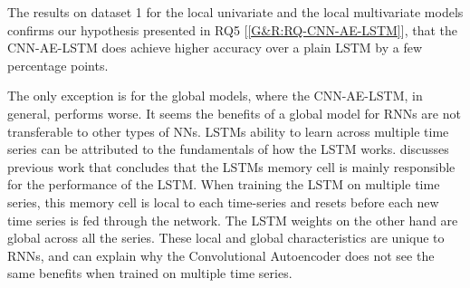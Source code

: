 The results on dataset 1 for the local univariate and the local multivariate models
confirms our hypothesis presented in RQ5 [\ref{G&R:RQ-CNN-AE-LSTM}], that the
CNN-AE-LSTM does achieve higher accuracy over a plain LSTM by a few percentage points.

The only exception is for the global models, where the CNN-AE-LSTM, in general, performs worse.
It seems the benefits of a global model for RNNs are not transferable to other types
of NNs. LSTMs ability to learn across multiple time series can be attributed to the fundamentals
of how the LSTM works. \cite{Zhao2019} discusses previous work that concludes that
the LSTMs memory cell is mainly responsible for the performance of the LSTM.
When training the LSTM on multiple time series, this memory cell is local to each
time-series and resets before each new time series is fed through the network.
The LSTM weights on the other hand are global across all the series.
These local and global characteristics are unique to RNNs, and can explain
why the Convolutional Autoencoder does not see the same benefits when trained on multiple
time series.





%
%





